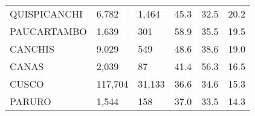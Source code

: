 \begin{tabular}{llllll}
	\cellcolor[HTML]{FF5050}QUISPICANCHI                           & 6,782                                                                 & 1,464                                                            & 45.3                                                                             & 32.5                                                                        & 20.2                                                                                \\
	\cellcolor[HTML]{FF5050}PAUCARTAMBO                            & 1,639                                                                 & 301                                                              & 58.9                                                                             & 35.5                                                                        & 19.5                                                                                \\
	\cellcolor[HTML]{FF5050}CANCHIS                                & 9,029                                                                 & 549                                                              & 48.6                                                                             & 38.6                                                                        & 19.0                                                                                \\
	\cellcolor[HTML]{FF5050}CANAS                                  & 2,039                                                                 & 87                                                               & 41.4                                                                             & 56.3                                                                        & 16.5                                                                                \\
	\cellcolor[HTML]{F8CBAD}CUSCO                                  & 117,704                                                               & 31,133                                                           & 36.6                                                                             & 34.6                                                                        & 15.3                                                                                \\
	\cellcolor[HTML]{F8CBAD}PARURO                                 & 1,544                                                                 & 158                                                              & 37.0                                                                             & 33.5                                                                        & 14.3                                                                                \\

\end{tabular}
